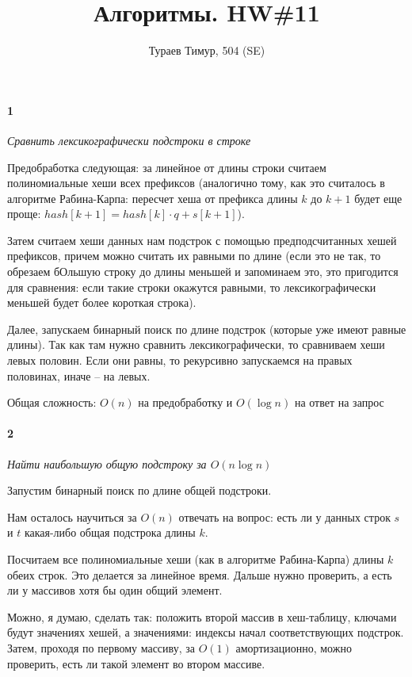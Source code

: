 \documentclass[russian]{article}
\begin{document}
\title{Алгоритмы. HW\#11}
\author{Тураев Тимур, 504 (SE)}
\maketitle

\paragraph*{1}

\textit{Сравнить лексикографически подстроки в строке}

Предобработка следующая: за линейное от длины строки считаем полиномиальные хеши всех префиксов (аналогично тому, как это считалось в алгоритме Рабина-Карпа: пересчет хеша от префикса длины $k$ до $k+1$ будет еще проще: $hash[k+1] = hash[k] \cdot q + s[k+1]$). 

Затем считаем хеши данных нам подстрок с помощью предподсчитанных хешей префиксов, причем можно считать их равными по длине (если это не так, то обрезаем бОльшую строку до длины меньшей и запоминаем это, это пригодится для сравнения: если такие строки окажутся равными, то лексикографически меньшей будет более короткая строка).

Далее, запускаем бинарный поиск по длине подстрок (которые уже имеют равные длины). Так как там нужно сравнить лексикографически, то сравниваем хеши левых половин. Если они равны, то рекурсивно запускаемся на правых половинах, иначе -- на левых. 

Общая сложность: $O(n)$ на предобработку и $O(\log n)$ на ответ на запрос

\paragraph*{2}

\textit{Найти наибольшую общую подстроку за $O(n \log n)$}

Запустим бинарный поиск по длине общей подстроки.

Нам осталось научиться за $O(n)$ отвечать на вопрос: есть ли у данных строк $s$  и $t$ какая-либо общая подстрока длины $k$.

Посчитаем все полиномиальные хеши (как в алгоритме Рабина-Карпа) длины $k$ обеих строк. Это делается за линейное время. Дальше нужно проверить, а есть ли у массивов хотя бы один общий элемент.

Можно, я думаю, сделать так: положить второй массив в хеш-таблицу, ключами будут значениях хешей, а значениями: индексы начал соответствующих подстрок. Затем, проходя по первому массиву, за $O(1)$ амортизационно, можно проверить, есть ли такой элемент во втором массиве.
\end{document}
